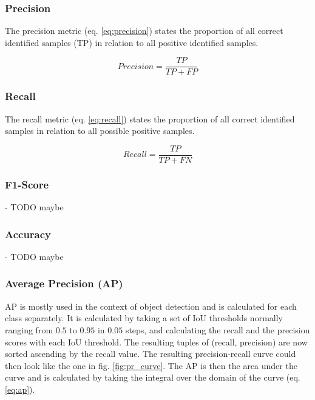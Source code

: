 \subsubsection{Precision}

The precision metric (eq. \ref{eq:precision}) states the proportion of all correct identified samples (\ac{TP}) in relation to all positive identified samples.

\begin{equation}
    Precision = \frac{TP}{TP + FP}
    \label{eq:precision}
\end{equation}

\subsubsection{Recall}

The recall metric (eq. \ref{eq:recall}) states the proportion of all correct identified samples in relation to all possible positive samples.

\begin{equation}
    Recall = \frac{TP}{TP + FN}
    \label{eq:recall}
\end{equation}

\subsubsection{F1-Score}

- TODO maybe

\subsubsection{Accuracy}

- TODO maybe

\subsubsection{Average Precision (AP)}

\ac{AP} is mostly used in the context of object detection and is calculated for each class separately.
It is calculated by taking a set of \ac{IoU} thresholds normally ranging from $0.5$ to $0.95$ in $0.05$ steps, and calculating the recall and the precision scores with each \ac{IoU} threshold.
The resulting tuples of (recall, precision) are now sorted ascending by the recall value.
The resulting precision-recall curve could then look like the one in fig. \ref{fig:pr_curve}.
The \ac{AP} is then the area under the curve and is calculated
by taking the integral over the domain of the curve (eq. \ref{eq:ap}).

